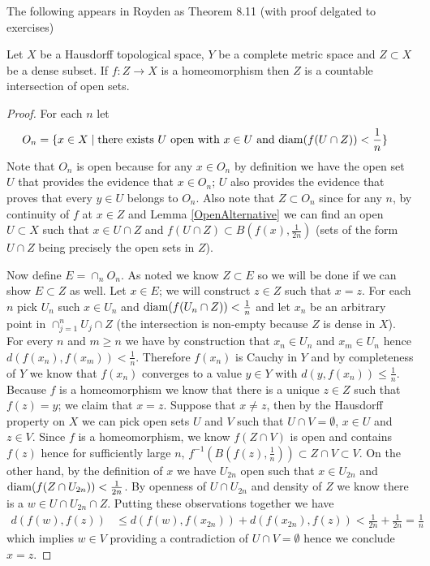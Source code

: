  The following appears in Royden as Theorem 8.11 (with proof delgated
to exercises)
\begin{lem}Let $X$ be a Hausdorff topological space, $Y$ be a
  complete metric space and $Z \subset X$ be a dense subset.  If $f :
  Z \to X$ is a homeomorphism then $Z$ is a countable intersection of
  open sets.
\end{lem}
\begin{proof}
For each $n$ let 
\begin{align*}
O_n &= \lbrace x \in X \mid \text{there exists $U$
  open with $x \in U$ and $\operatorname*{diam}(f(U \cap Z)) < \frac{1}{n}$} \rbrace
\end{align*}
Note that $O_n$ is open because for any $x \in O_n$ by definition we
have the open set $U$ that provides the evidence that $x \in O_n$;
$U$ also provides the evidence that proves that every $y \in U$
belongs to $O_n$.  Also
note that $Z \subset O_n$ since for any $n$, by continuity of $f$ at $x \in Z$ and Lemma
\ref{OpenAlternative}  we
can find an open $U \subset X$ such that $x \in U \cap Z$ and $f(U \cap Z) \subset B(f(x),
\frac{1}{2n})$ (sets of the form $U \cap Z$ being precisely the open
sets in $Z$).

Now define $E = \cap_n O_n$.  As noted we know $Z \subset E$ so we
will be done if we can show $E
\subset Z$ as well.  Let $x \in E$; we will construct $z \in Z$
such that $x = z$.  For each $n$ pick $U_n$ such $x \in U_n$ and $\operatorname*{diam}(f(U_n \cap Z)) <
\frac{1}{n}$ and let $x_n$ be an arbitrary point in $\cap_{j=1}^n
U_j \cap Z$ (the intersection is non-empty because $Z$ is dense in
$X$).  
For every $n$ and $m \geq n$ we have by construction that $x_n
\in U_n$ and $x_m \in U_n$ hence $d(f(x_n), f(x_m)) < \frac{1}{n}$.
Therefore $f(x_n)$ is Cauchy in
$Y$ and by completeness of $Y$ we know that $f(x_n)$ converges to a
value $y \in Y$ with $d(y, f(x_n)) \leq \frac{1}{n}$.  
Because $f$ is a homeomorphism we know that 
there is a unique $z \in Z$ such that $f(z) = y$; we claim that $x =
z$.  Suppose that $x
\neq z$, then by the Hausdorff property on $X$ we can pick open sets $U$ and
$V$ such that $U \cap V = \emptyset$, $x \in U$ and $z \in V$.  Since
$f$ is a homeomorphism, we know $f(Z \cap V)$ is open and contains
$f(z)$ hence for sufficiently large $n$, $f^{-1}(B(f(z), \frac{1}{n}))
\subset Z \cap V \subset V$.  On
the other hand, by the definition of $x$ we have $U_{2n}$ open such that
$x \in U_{2n}$ and $\operatorname*{diam}(f(Z \cap U_{2n})) < \frac{1}{2n}$.  By openness of
$U \cap U_{2n}$ and density of $Z$ we know there is a $w \in U \cap
U_{2n} \cap Z$.  Putting these observations together we have
\begin{align*}
d(f(w), f(z)) &\leq  d(f(w), f(x_{2n})) + d(f(x_{2n}), f(z)) 
< \frac{1}{2n} + \frac{1}{2n} = \frac{1}{n}
\end{align*}
which implies $w \in V$ providing a contradiction of $U \cap V =
\emptyset$ hence we conclude $x = z$.
\end{proof}

